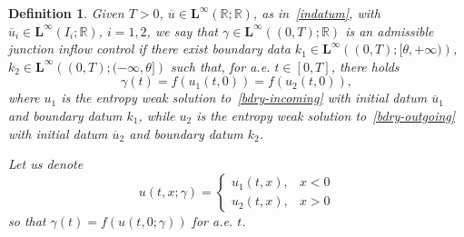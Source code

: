 \documentclass[a4paper, 10pt, final]{article}
\newtheorem{definition}{Definition}[section]
\newcommand{\R}{\mathbb{R}} \newcommand{\N}{\mathbb{N}}
\begin{document}
\begin{definition}\label{defiammissibile} 
  Given $T>0$, $\overline u\in 
  \mathbf{L^\infty}(\R;\R)$,
  as in~\eqref{indatum}, with
  $\overline u_i\in  \mathbf{L^\infty}(I_i; \R)$, $i=1,2$,
  we say that $\gamma \in \mathbf{L^\infty}((0,T);\R)$
  is an admissible junction inflow
  control if there exist boundary data\linebreak
  $k_1 \in \mathbf{L^\infty}\left((0,T); [\theta,+\infty) \right)$, $k_2 \in \mathbf{L^\infty}\left((0,T); 
  (-\infty,\theta] \right)$ 
  such that, for a.e. $t\in [0,T]$,
  there holds
  \begin{equation}
    \label{gammat} 
    \gamma(t)=f(u_1(t,0)) = f(u_2(t, 0)),
  \end{equation}
  where $u_1$ is the entropy weak solution to~\eqref{bdry-incoming} with initial 
  datum $\overline u_1$ and boundary datum $k_1$,  while $u_2$ is the entropy weak solution to~\eqref{bdry-outgoing} 
  with initial datum $\overline u_2$ and boundary datum $k_2$. 

  Let us denote  
  \begin{equation}
    \label{ugamma-2} 
    u(t,x; \gamma)= \begin{cases}u_1(t,x),
    & x<0 \\ u_2(t,x),
    & x>0 \end{cases}
  \end{equation} 
  so that   
  $\gamma (t)= f(u(t, 0; \gamma)) $ for a.e. $t$.
\end{definition}
\end{document}
